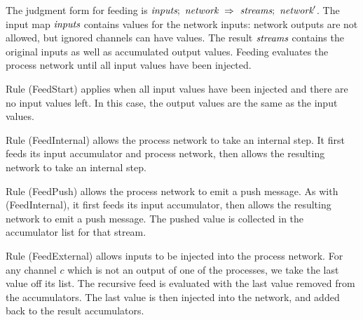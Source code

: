 \smallskip

The judgment form for feeding is $\textit{inputs};~\textit{network}~\Rightarrow~\textit{streams};~\textit{network}'$.
The input map $\textit{inputs}$ contains values for the network inputs: network outputs are not allowed, but ignored channels can have values.
The result $\textit{streams}$ contains the original inputs as well as accumulated output values.
Feeding evaluates the process network until all input values have been injected.



Rule (FeedStart) applies when all input values have been injected and there are no input values left.
In this case, the output values are the same as the input values.

Rule (FeedInternal) allows the process network to take an internal step.
It first feeds its input accumulator and process network, then allows the resulting network to take an internal step.

Rule (FeedPush) allows the process network to emit a push message.
As with (FeedInternal), it first feeds its input accumulator, then allows the resulting network to emit a push message.
The pushed value is collected in the accumulator list for that stream.

Rule (FeedExternal) allows inputs to be injected into the process network.
For any channel $c$ which is not an output of one of the processes, we take the last value off its list.
The recursive feed is evaluated with the last value removed from the accumulators.
The last value is then injected into the network, and added back to the result accumulators.






